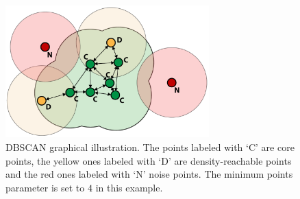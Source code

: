 \documentclass[lnicst,a4paper]{svmultln}
\begin{document}
\begin{figure}
 	\centerline{\includegraphics[width=0.7\textwidth]{dbscan1.pdf}}
	{\caption{DBSCAN graphical illustration.
	The points labeled with `C' are core points,
	the yellow ones labeled with `D' are density-reachable points
	and the red ones labeled with `N' noise points.
	The minimum points parameter is set to $4$ in this example.}\label{fig:dbscan_illustration1}}
\end{figure}
\end{document}

